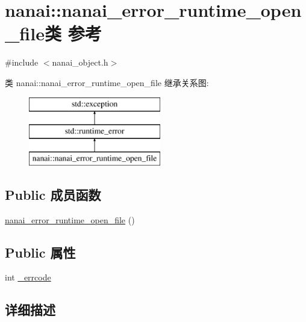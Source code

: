\hypertarget{classnanai_1_1nanai__error__runtime__open__file}{}\section{nanai\+:\+:nanai\+\_\+error\+\_\+runtime\+\_\+open\+\_\+file类 参考}
\label{classnanai_1_1nanai__error__runtime__open__file}


{\ttfamily \#include $<$nanai\+\_\+object.\+h$>$}

类 nanai\+:\+:nanai\+\_\+error\+\_\+runtime\+\_\+open\+\_\+file 继承关系图\+:\begin{figure}[H]
\begin{center}
\leavevmode
\includegraphics[height=3.000000cm]{classnanai_1_1nanai__error__runtime__open__file}
\end{center}
\end{figure}
\subsection*{Public 成员函数}
\begin{DoxyCompactItemize}
\item 
\hyperlink{classnanai_1_1nanai__error__runtime__open__file_a7ecafd733718b1371cd049961c862bd2}{nanai\+\_\+error\+\_\+runtime\+\_\+open\+\_\+file} ()
\end{DoxyCompactItemize}
\subsection*{Public 属性}
\begin{DoxyCompactItemize}
\item 
int \hyperlink{classnanai_1_1nanai__error__runtime__open__file_a60f374c9a5f457328bf76a8576a61646}{\+\_\+errcode}
\end{DoxyCompactItemize}


\subsection{详细描述}


